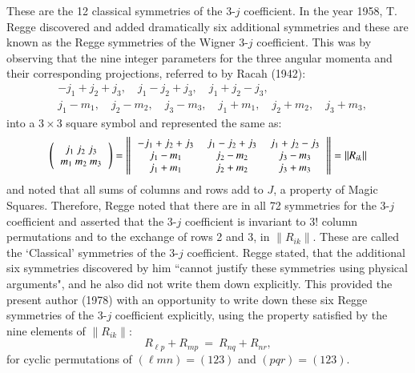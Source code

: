 These are the 12 classical symmetries of the 3-$j$ coefficient. In the year 1958, T. Regge discovered and added dramatically six additional symmetries and these are known as the Regge symmetries of the Wigner 3-$j$ coefficient. This was by observing that the nine integer parameters for the three angular momenta and their corresponding projections, referred to by Racah (1942):
\begin{equation}
\begin{split}
& -j_1+j_2+j_3, \quad  j_1-j_2+j_3, \quad j_1+j_2-j_3,\\
& j_1-m_1,\quad j_2-m_2,\quad j_3-m_3,\quad j_1+m_1,\quad j_2+m_2,\quad j_3+m_3,\label{chap7-eq10}
\end{split}
\end{equation}
into a $3\times 3$ square symbol and represented the same as:
{\begin{equation}\fontsize{9.5pt}{11pt}\selectfont
\left(
\begin{tabular}{ccc}
$j_1\ j_2\ j_3$\\ 
$m_1\ m_2\ m_3$\\ 
\end{tabular} 
\right) 
= \left\| 
\begin{tabular}{ccc}
$-j_1+j_2+j_3$ & $j_1-j_2+j_3$ &  $j_1+j_2-j_3$\\
$j_1-m_1$ & $j_2-m_2$ & $j_3-m_3$\\
$j_1+m_1$ & $j_2+m_2$ & $j_3+m_3$\\
\end{tabular} 
\right\|
=\|R_{ik}\| \label{chap7-eq11}
\end{equation}}\relax
and noted that all sums of columns and rows add to $J$, a property of Magic Squares. Therefore, Regge noted that there are in all 72 symmetries for the 3-$j$ coefficient and asserted that the 3-$j$ coefficient is invariant to 3! column permutations and to the exchange of rows 2 and 3, in $\|R_{ik}\|$. These are called the `Classical' symmetries of the 3-$j$ coefficient. Regge stated, that the additional six symmetries discovered by him ``cannot justify these symmetries using physical arguments", and he also did not write them down explicitly. This provided the present author (1978) with an opportunity to write down these six Regge symmetries of the 3-$j$ coefficient explicitly, using the property satisfied by the nine elements of $\|R_{ik}\|$:
\begin{equation}
R_{\ell p} + R_{mp}\ =\ R_{nq} + R_{nr},\label{chap7-eq12}
\end{equation}
for cyclic permutations of $(\ell mn)=(123)$ and $(pqr)=(123)$. 

